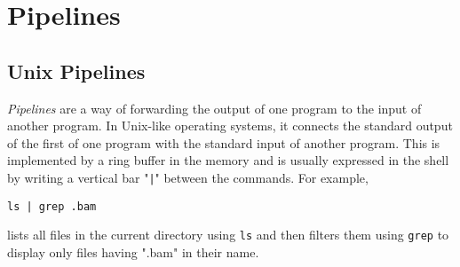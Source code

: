 \section{Pipelines}

\subsection{Unix Pipelines}

\textit{Pipelines} are a way of forwarding the output of one program to the input of another program. In Unix-like operating systems, it connects the standard output of the first of one program with the standard input of another program. This is implemented by a ring buffer in the memory and is usually expressed in the shell by writing a vertical bar "\texttt{|}" between the commands. For example, 
\begin{verbatim} 
ls | grep .bam 
\end{verbatim}
lists all files in the current directory using \texttt{ls} and then filters them using \texttt{grep} to display only files having ".bam" in their name. 

